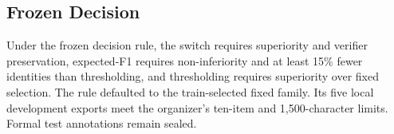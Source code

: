 \subsection{Frozen Decision}

Under the frozen decision rule, the switch requires superiority and verifier preservation, expected-F1 requires non-inferiority and at least 15\% fewer identities than thresholding, and thresholding requires superiority over fixed selection. The rule defaulted to the train-selected fixed family. Its five local development exports meet the organizer's ten-item and 1,500-character limits. Formal test annotations remain sealed.
